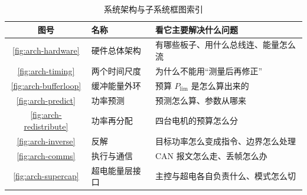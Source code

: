 \documentclass[cn,blue,11pt,device=normal]{elegantnote}
\newcommand{\Plim}{P_{\mathrm{lim}}{}}
\begin{document}
\begin{table}[htbp]
  \centering
  \small
  \caption{系统架构与子系统框图索引}
  \label{tab:arch-index}
  \begin{tabular}{@{}cl>{\raggedright\arraybackslash}p{}@{}}
    \toprule
    图号 & 名称 & 看它主要解决什么问题 \\
    \midrule
    \ref{fig:arch-hardware}     & 硬件总体架构 & 有哪些板子、用什么总线连、能量怎么流 \\
    \ref{fig:arch-timing}       & 两个时间尺度 & 为什么不能用“测量后再修正” \\
    \ref{fig:arch-bufferloop}   & 缓冲能量外环 & 预算 $\Plim$ 是怎么算出来的 \\
    \ref{fig:arch-predict}      & 功率预测 & 预测怎么算、参数从哪来 \\
    \ref{fig:arch-redistribute} & 功率再分配 & 四台电机的预算怎么分 \\
    \ref{fig:arch-inverse}      & 反解 & 目标功率怎么变成指令、边界怎么处理 \\
    \ref{fig:arch-comms}        & 执行与通信 & CAN 报文怎么走、丢帧怎么办 \\
    \ref{fig:arch-supercap}     & 超电能量层接口 & 主控与超电各自负责什么、模式怎么切 \\
    \bottomrule
  \end{tabular}
\end{table}

\printbibliography[heading=bibintoc, title=\ebibname]
\end{document}
